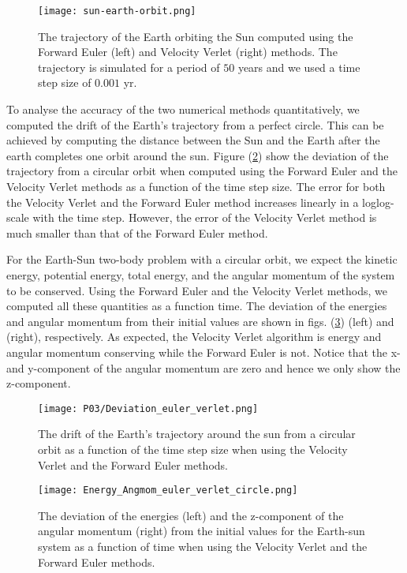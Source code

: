 \documentclass[a4paper]{article}
\begin{document}
\begin{figure}[H]
  \centering
  \texttt{[image: sun-earth-orbit.png]}
  \caption{The trajectory of the Earth orbiting the Sun computed using the Forward Euler (left) and Velocity Verlet (right) methods. The trajectory is simulated for a period of $50$ years and we used a time step size of $0.001$ yr.}
   \label{euler_verlet_2body}
\end{figure}



To analyse the accuracy of the two numerical methods quantitatively, we computed the drift of the Earth's trajectory from a perfect circle. This can be achieved by computing the distance between the Sun and the Earth after the earth completes one orbit around the sun. Figure (\ref{euler_verlet_deviation1}) show the deviation of the trajectory from a circular orbit when computed using the Forward Euler and the Velocity Verlet methods as a function of the time step size. The error for both the Velocity Verlet and the Forward Euler method increases linearly in a loglog-scale with the time step. However, the error of the Velocity Verlet method is much smaller than that of the Forward Euler method.



For the Earth-Sun two-body problem with a circular orbit, we expect the kinetic energy, potential energy, total energy, and the angular momentum of the system to be conserved. Using the Forward Euler and the Velocity Verlet methods, we computed all these quantities as a function time. The deviation of the energies and angular momentum from their initial values are shown in figs. (\ref{Energy_Angmom_euler_verlet}) (left) and (right), respectively. As expected, the Velocity Verlet algorithm is energy and angular momentum conserving while the Forward Euler is not. Notice that the x- and y-component of the angular momentum are zero and hence we only show the z-component.
\begin{figure}[H]
  \centering
  \texttt{[image: P03/Deviation\_euler\_verlet.png]}
  \caption{The drift of the Earth's trajectory around the sun from a circular orbit as a function of the time step size when using the Velocity Verlet and the Forward Euler methods.}
   \label{euler_verlet_deviation1}
\end{figure}


\begin{figure}[H]
  \centering
  \texttt{[image: Energy\_Angmom\_euler\_verlet\_circle.png]}
  \caption{The deviation of the energies (left) and the z-component of the angular momentum (right) from the initial values for the Earth-sun system as a function of time when using the Velocity Verlet and the Forward Euler methods. }
   \label{Energy_Angmom_euler_verlet}
\end{figure}
\end{document}
